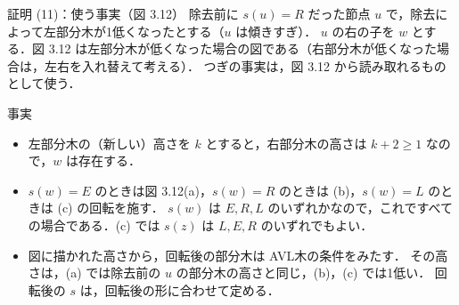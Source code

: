 \documentclass[aspectratio=169,11pt]{beamer}
\begin{document}
\begin{frame}{証明 (11)：使う事実（図 3.12）}
  \small
  除去前に $s(u)=R$ だった節点 $u$ で，除去によって左部分木が1低くなったとする（$u$ は傾きすぎ）．
  $u$ の右の子を $w$ とする．図 3.12 は左部分木が低くなった場合の図である（右部分木が低くなった場合は，左右を入れ替えて考える）．
  つぎの事実は，\alert{図 3.12 から読み取れるものとして使う}．
  \begin{block}{事実}
    \begin{itemize}
      \item[(G1)] 左部分木の（新しい）高さを $k$ とすると，右部分木の高さは $k+2\ge1$ なので，$w$ は存在する．
      \item[(G2)] $s(w)=E$ のときは図 3.12(a)，$s(w)=R$ のときは (b)，$s(w)=L$ のときは (c) の回転を施す．
        $s(w)$ は $E,R,L$ のいずれかなので，これですべての場合である．(c) では $s(z)$ は $L,E,R$ のいずれでもよい．
      \item[(G3)] 図に描かれた高さから，回転後の部分木は AVL木の条件をみたす．
        その高さは，(a) では除去前の $u$ の部分木の高さと同じ，(b)，(c) では1低い．
        回転後の $s$ は，回転後の形に合わせて定める．
    \end{itemize}
  \end{block}
\end{frame}
\end{document}

